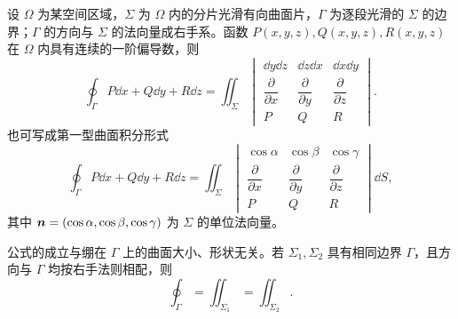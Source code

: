 设 $\Omega$ 为某空间区域，$\Sigma$ 为 $\Omega$ 内的分片光滑有向曲面片，$\Gamma$ 为逐段光滑的 $\Sigma$ 的边界；$\Gamma$ 的方向与 $\Sigma$ 的法向量成右手系。函数 $P(x,y,z),Q(x,y,z),R(x,y,z)$ 在 $\Omega$ 内具有连续的一阶偏导数，则
\[
\boxed{
\oint_{\Gamma}P\dd x+Q\dd y+R\dd z
=\iint_{\Sigma}
\begin{vmatrix}
\dd y\dd z&\dd z\dd x&\dd x\dd y\\
\dfrac{\partial}{\partial x}&\dfrac{\partial}{\partial y}&\dfrac{\partial}{\partial z}\\
P&Q&R
\end{vmatrix}
}.
\]
也可写成第一型曲面积分形式
\[
\oint_{\Gamma}P\dd x+Q\dd y+R\dd z
=\iint_{\Sigma}
\begin{vmatrix}
\cos\alpha&\cos\beta&\cos\gamma\\
\dfrac{\partial}{\partial x}&\dfrac{\partial}{\partial y}&\dfrac{\partial}{\partial z}\\
P&Q&R
\end{vmatrix}\dd S,
\]
其中 $\bm n=(\cos\alpha,\cos\beta,\cos\gamma)$ 为 $\Sigma$ 的单位法向量。

\par\noindent{}\quad
公式的成立与绷在 $\Gamma$ 上的曲面大小、形状无关。若 $\Sigma_1,\Sigma_2$ 具有相同边界 $\Gamma$，且方向与 $\Gamma$ 均按右手法则相配，则
\[
\oint_{\Gamma}=\iint_{\Sigma_1}=\iint_{\Sigma_2}.
\]

